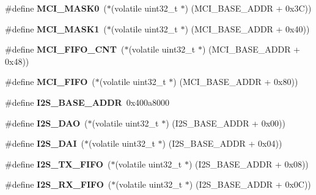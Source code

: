 \begin{DoxyCompactItemize}
\#define {\bfseries M\+C\+I\+\_\+\+M\+A\+S\+K0}~($\ast$(volatile uint32\+\_\+t $\ast$) (M\+C\+I\+\_\+\+B\+A\+S\+E\+\_\+\+A\+D\+DR + 0x3\+C))
\item 
\mbox{\label{group__lpc24xx__regs_ga43010f455ebf6442b306915c14b356bb}} 
\#define {\bfseries M\+C\+I\+\_\+\+M\+A\+S\+K1}~($\ast$(volatile uint32\+\_\+t $\ast$) (M\+C\+I\+\_\+\+B\+A\+S\+E\+\_\+\+A\+D\+DR + 0x40))
\item 
\mbox{\label{group__lpc24xx__regs_gaebd250577f90667fa300df358fc19a5d}} 
\#define {\bfseries M\+C\+I\+\_\+\+F\+I\+F\+O\+\_\+\+C\+NT}~($\ast$(volatile uint32\+\_\+t $\ast$) (M\+C\+I\+\_\+\+B\+A\+S\+E\+\_\+\+A\+D\+DR + 0x48))
\item 
\mbox{\label{group__lpc24xx__regs_ga216bbb50d1e801d721b3f97512ab2b1b}} 
\#define {\bfseries M\+C\+I\+\_\+\+F\+I\+FO}~($\ast$(volatile uint32\+\_\+t $\ast$) (M\+C\+I\+\_\+\+B\+A\+S\+E\+\_\+\+A\+D\+DR + 0x80))
\item 
\mbox{\label{group__lpc24xx__regs_ga5813eeeeed993b9c42ffeeae1d919d63}} 
\#define {\bfseries I2\+S\+\_\+\+B\+A\+S\+E\+\_\+\+A\+D\+DR}~0x400a8000
\item 
\mbox{\label{group__lpc24xx__regs_gae348c2a2fbb511afde54e64b8d6039a7}} 
\#define {\bfseries I2\+S\+\_\+\+D\+AO}~($\ast$(volatile uint32\+\_\+t $\ast$) (I2\+S\+\_\+\+B\+A\+S\+E\+\_\+\+A\+D\+DR + 0x00))
\item 
\mbox{\label{group__lpc24xx__regs_gaa5f1f1aa1ee4b91a244322d9489375c1}} 
\#define {\bfseries I2\+S\+\_\+\+D\+AI}~($\ast$(volatile uint32\+\_\+t $\ast$) (I2\+S\+\_\+\+B\+A\+S\+E\+\_\+\+A\+D\+DR + 0x04))
\item 
\mbox{\label{group__lpc24xx__regs_ga463a445671402bd6d05f49c2fe83cf7d}} 
\#define {\bfseries I2\+S\+\_\+\+T\+X\+\_\+\+F\+I\+FO}~($\ast$(volatile uint32\+\_\+t $\ast$) (I2\+S\+\_\+\+B\+A\+S\+E\+\_\+\+A\+D\+DR + 0x08))
\item 
\mbox{\label{group__lpc24xx__regs_ga94236bb9b29a41852be49c7d8ab4ab86}} 
\#define {\bfseries I2\+S\+\_\+\+R\+X\+\_\+\+F\+I\+FO}~($\ast$(volatile uint32\+\_\+t $\ast$) (I2\+S\+\_\+\+B\+A\+S\+E\+\_\+\+A\+D\+DR + 0x0\+C))

\end{DoxyCompactItemize}
